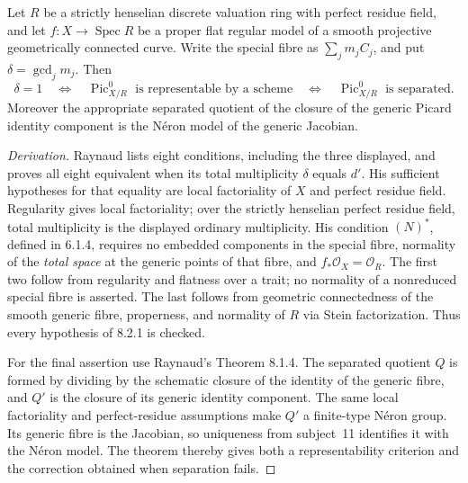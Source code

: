 \begin{theorem}\label{B:subject17}
Let $R$ be a strictly henselian discrete valuation ring with perfect residue field, and let $f:X\to\operatorname{Spec}R$ be a proper flat regular model of a smooth projective geometrically connected curve. Write the special fibre as $\sum_jm_jC_j$, and put $\delta=\gcd_jm_j$. Then
\[
 \delta=1\quad\Longleftrightarrow\quad
 \operatorname{Pic}^0_{X/R}\text{ is representable by a scheme}
 \quad\Longleftrightarrow\quad
 \operatorname{Pic}^0_{X/R}\text{ is separated}.
\]
Moreover the appropriate separated quotient of the closure of the generic Picard identity component is the N\'eron model of the generic Jacobian.
\end{theorem}
\begin{proof}[Derivation]
Raynaud \cite[Theorem 8.2.1]{BRaynaud1970} lists eight conditions, including the three displayed, and proves all eight equivalent when its total multiplicity $\delta$ equals $d'$. His sufficient hypotheses for that equality are local factoriality of $X$ and perfect residue field. Regularity gives local factoriality; over the strictly henselian perfect residue field, total multiplicity is the displayed ordinary multiplicity. His condition $(N)^*$, defined in 6.1.4, requires no embedded components in the special fibre, normality of the \emph{total space} at the generic points of that fibre, and $f_*\mathcal O_X=\mathcal O_R$. The first two follow from regularity and flatness over a trait; no normality of a nonreduced special fibre is asserted. The last follows from geometric connectedness of the smooth generic fibre, properness, and normality of $R$ via Stein factorization. Thus every hypothesis of 8.2.1 is checked.

For the final assertion use Raynaud's Theorem 8.1.4. The separated quotient $Q$ is formed by dividing by the schematic closure of the identity of the generic fibre, and $Q'$ is the closure of its generic identity component. The same local factoriality and perfect-residue assumptions make $Q'$ a finite-type N\'eron group. Its generic fibre is the Jacobian, so uniqueness from subject~11 identifies it with the N\'eron model. The theorem thereby gives both a representability criterion and the correction obtained when separation fails.
\end{proof}

